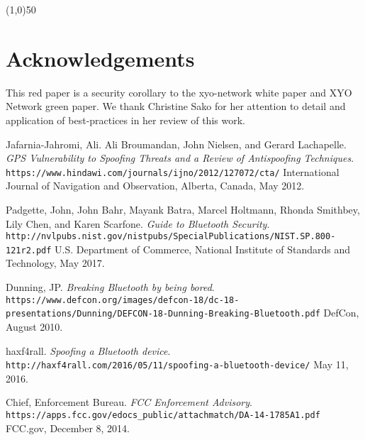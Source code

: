 \documentclass{article}
\begin{document}
\begin{center}
\line(1,0){50}
\end{center}

\section {Acknowledgements}
This red paper is a security corollary to the \Gls{xyo-network} white paper and XYO Network green paper. We thank Christine Sako for her attention to detail and application of best-practices in her review of this work.

\begin{thebibliography}{9}


Jafarnia-Jahromi, Ali. Ali Broumandan, John Nielsen, and Gerard Lachapelle.
\textit{GPS Vulnerability to Spoofing Threats and a Review of Antispoofing Techniques}.
\\\texttt{https://www.hindawi.com/journals/ijno/2012/127072/cta/}
International Journal of Navigation and Observation, Alberta, Canada, May 2012.

Padgette, John, John Bahr, Mayank Batra, Marcel Holtmann, Rhonda Smithbey, Lily Chen, and Karen Scarfone.
\textit{Guide to Bluetooth Security}.
\\\texttt{http://nvlpubs.nist.gov/nistpubs/SpecialPublications/NIST.SP.800-121r2.pdf}
U.S. Department of Commerce, National Institute of Standards and Technology, May 2017.

Dunning, JP.
\textit{Breaking Bluetooth by being bored}.
\\\texttt{https://www.defcon.org/images/defcon-18/dc-18-presentations\-/Dunning/DEFCON-18-Dunning-Breaking-Bluetooth.pdf}
DefCon, August 2010.

haxf4rall.
\textit{Spoofing a Bluetooth device}.
\\\texttt{http://haxf4rall.com/2016/05/11/spoofing-a-bluetooth-device/}
May 11, 2016.

Chief, Enforcement Bureau.
\textit{FCC Enforcement Advisory}.
\\\texttt{https://apps.fcc.gov/edocs\_public/attachmatch/DA-14-1785A1.pdf}
FCC.gov, December 8, 2014.

\end{thebibliography}
\printglossaries

\end{document}
